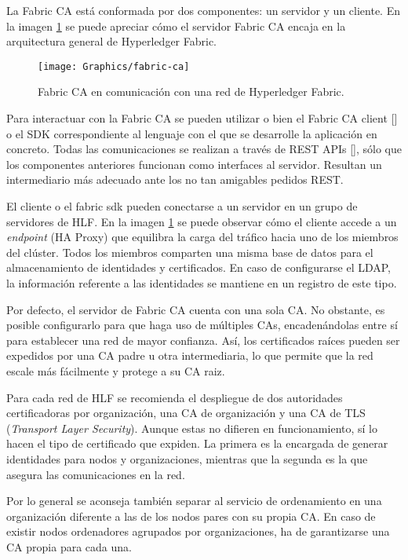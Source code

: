 La Fabric CA est\'a conformada por dos componentes: un servidor y un cliente. En la imagen \ref{fig:cadiagram} se puede apreciar c\'omo el servidor Fabric CA encaja en la arquitectura general de Hyperledger Fabric.

\begin{figure}[h]
	\centering
	\texttt{[image: Graphics/fabric-ca]}
	\caption{Fabric CA en comunicaci\'on con una red de Hyperledger Fabric.}
	\label{fig:cadiagram}
\end{figure}

Para interactuar con la Fabric CA se pueden utilizar o bien el Fabric CA client [\cite{caclient}] o el SDK correspondiente al lenguaje con el que se desarrolle la aplicaci\'on en concreto. Todas las comunicaciones se realizan a trav\'es de REST APIs [\cite{restapifaclient}], s\'olo que los componentes anteriores funcionan como interfaces al servidor. Resultan un intermediario m\'as adecuado ante los no tan amigables pedidos REST.

El cliente o el fabric sdk pueden conectarse a un servidor en un grupo de servidores de HLF. En la imagen \ref{fig:cadiagram} se puede observar c\'omo el cliente accede a un \emph{endpoint} (HA Proxy) que equilibra la carga del tr\'afico hacia uno de los miembros del cl\'uster. Todos los miembros comparten una misma base de datos para el almacenamiento de identidades y certificados. En caso de configurarse el LDAP, la informaci\'on referente a las identidades se mantiene en un registro de este tipo.

Por defecto, el servidor de Fabric CA cuenta con una sola CA. No obstante, es posible configurarlo para que haga uso de m\'ultiples CAs, encaden\'andolas entre s\'i para establecer una red de mayor confianza. As\'i, los certificados ra\'ices pueden ser expedidos por una CA padre u otra intermediaria, lo que permite que la red escale m\'as f\'acilmente y protege a su CA raiz.%

Para cada red de HLF se recomienda el despliegue de dos autoridades certificadoras por organizaci\'on, una CA de organizaci\'on y una CA de TLS (\emph{Transport Layer Security}). Aunque estas no difieren en funcionamiento, s\'i lo hacen el tipo de certificado que expiden. La primera es la encargada de generar identidades para nodos y organizaciones, mientras que la segunda es la que asegura las comunicaciones en la red.

Por lo general se aconseja tambi\'en separar al servicio de ordenamiento en una organizaci\'on diferente a las de los nodos pares con su propia CA. En caso de existir nodos ordenadores agrupados por organizaciones, ha de garantizarse una CA propia para cada una.


